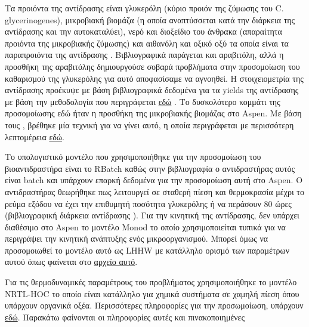 \documentclass[11pt]{article}
\begin{document}
Τα προιόντα της αντίδρασης είναι γλυκερόλη (κύριο προιόν της ζύμωσης του C. glycerinogenes), μικροβιακή βιομάζα (η οποία αναπτύσσεται κατά την διάρκεια της αντίδρασης και την αυτοκαταλύει), νερό και διοξείδιο του άνθρακα (απαραίτητα προιόντα της μικροβιακής ζύμωσης) και αιθανόλη και οξικό οξύ τα οποία είναι τα παραπροιόντα της αντίδρασης \cite{zhugeGlycerolProductionNovel2001} . Βιβλιογραφικά παράγεται και αραβιτόλη, αλλά η προσθήκη της αραβιτόλης δημιουργούσε σοβαρά προβλήματα στην προσομοίωση του καθαρισμού της γλυκερόλης για αυτό αποφασίσαμε να αγνοηθεί. Η στοιχειομετρία της αντίδρασης προέκυψε με βάση βιβλιογραφικά δεδομένα για τα yields της αντίδρασης \cite{jinByproductFormationNovel2003} με βάση την μεθοδολογία που περιγράφεται \href{https://github.com/Vidianos-Giannitsis/Process-Design/blob/master/bioreactor\_stoichiometry.org}{εδώ} . Το δυσκολότερο κομμάτι της προσομοίωσης εδώ ήταν η προσθήκη της μικροβιακής βιομάζας στο Aspen. Με βάση τους \cite{wooleyDevelopmentASPENPhysical1996}, βρέθηκε μία τεχνική για να γίνει αυτό, η οποία περιγράφεται με περισσότερη λεπτομέρεια \href{https://github.com/Vidianos-Giannitsis/Process-Design/blob/master/biomass\_modeling\_aspen.org}{εδώ}.

Το υπολογιστικό μοντέλο που χρησιμοποιήθηκε για την προσομοίωση του βιοαντιδραστήρα είναι το RBatch καθώς στην βιβλιογραφία ο αντιδραστήρας αυτός είναι batch και υπάρχουν επαρκή δεδομένα για την προσομοίωση αυτή στο Aspen. Ο αντιδραστήρας θεωρήθηκε πως λειτουργεί σε σταθερή πίεση και θερμοκρασία μέχρι το ρεύμα εξόδου να έχει την επιθυμητή ποσότητα γλυκερόλης ή να περάσουν 80 ώρες (βιβλιογραφική διάρκεια αντίδρασης \cite{jinByproductFormationNovel2003} ). Για την κινητική της αντίδρασης, δεν υπάρχει διαθέσιμο στο Aspen το μοντέλο Monod το οποίο χρησιμοποιείται τυπικά για να περιγράψει την κινητική ανάπτυξης ενός μικροοργανισμού. Μπορεί όμως να προσομοιωθεί το μοντέλο αυτό ως LHHW με κατάλληλο ορισμό των παραμέτρων αυτού όπως φαίνεται στο \href{https://github.com/Vidianos-Giannitsis/Process-Design/blob/master/Aspen/simplified\_bioreactor.org}{αρχείο αυτό}.

Για τις θερμοδυναμικές παραμέτρους του προβλήματος χρησιμοποιήθηκε το μοντέλο NRTL-HOC το οποίο είναι κατάλληλο για χημικά συστήματα σε χαμηλή πίεση όπου υπάρχουν οργανικά οξέα. Περισσότερες πληροφορίες για την προσωμοίωση, υπάρχουν \href{https://github.com/Vidianos-Giannitsis/Process-Design/blob/master/Aspen/complete\_bioreactor.org}{εδώ}. Παρακάτω φαίνονται οι πληροφορίες αυτές και πινακοποιημένες
\end{document}

